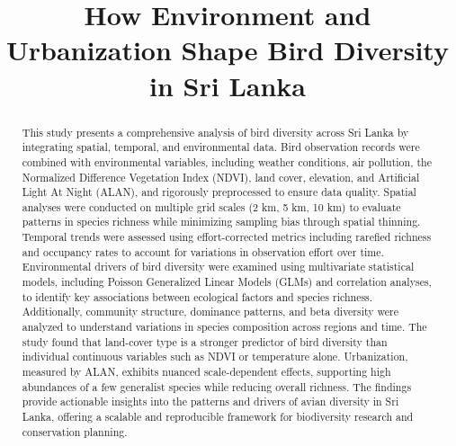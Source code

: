 \documentclass[conference]{IEEEtran}
\begin{document}
\title{How Environment and Urbanization Shape Bird Diversity in Sri Lanka}

\author{
}  


\maketitle

\begin{abstract}
This study presents a comprehensive analysis of bird diversity across Sri Lanka by integrating spatial, temporal, and environmental data. Bird observation records were combined with environmental variables, including weather conditions, air pollution, the Normalized Difference Vegetation Index (NDVI), land cover, elevation, and Artificial Light At Night (ALAN), and rigorously preprocessed to ensure data quality. Spatial analyses were conducted on multiple grid scales (2 km, 5 km, 10 km) to evaluate patterns in species richness while minimizing sampling bias through spatial thinning. Temporal trends were assessed using effort-corrected metrics including rarefied richness and occupancy rates to account for variations in observation effort over time. Environmental drivers of bird diversity were examined using multivariate statistical models, including Poisson Generalized Linear Models (GLMs) and correlation analyses, to identify key associations between ecological factors and species richness. Additionally, community structure, dominance patterns, and beta diversity were analyzed to understand variations in species composition across regions and time. The study found that land-cover type is a stronger predictor of bird diversity than individual continuous variables such as NDVI or temperature alone. Urbanization, measured by ALAN, exhibits nuanced scale-dependent effects, supporting high abundances of a few generalist species while reducing overall richness. The findings provide actionable insights into the patterns and drivers of avian diversity in Sri Lanka, offering a scalable and reproducible framework for biodiversity research and conservation planning. 

\end{abstract}
\end{document}

